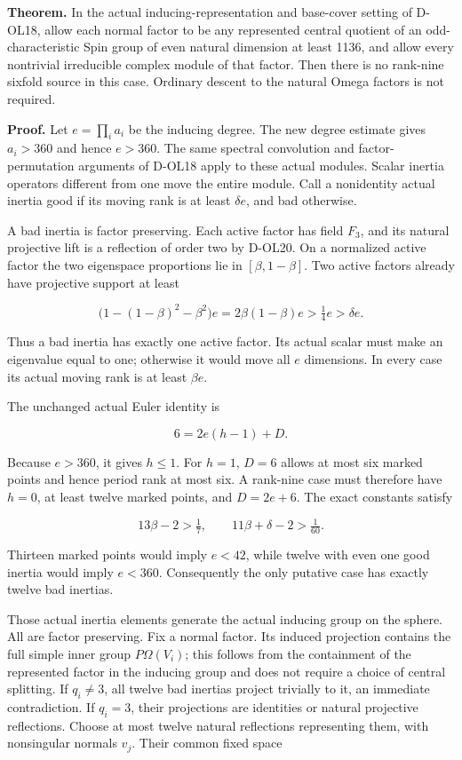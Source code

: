 \textbf{Theorem.} In the actual inducing-representation and base-cover setting of D-OL18, allow each normal factor to be any represented central quotient of an odd-characteristic Spin group of even natural dimension at least 1136, and allow every nontrivial irreducible complex module of that factor. Then there is no rank-nine sixfold source in this case. Ordinary descent to the natural Omega factors is not required.

\textbf{Proof.} Let \(e=\prod_i a_i\) be the inducing degree. The new degree estimate gives \(a_i>360\) and hence \(e>360\). The same spectral convolution and factor-permutation arguments of D-OL18 apply to these actual modules. Scalar inertia operators different from one move the entire module. Call a nonidentity actual inertia good if its moving rank is at least \(\delta e\), and bad otherwise.

A bad inertia is factor preserving. Each active factor has field \(F_3\), and its natural projective lift is a reflection of order two by D-OL20. On a normalized active factor the two eigenspace proportions lie in \([\beta,1-\beta]\). Two active factors already have projective support at least

\[
 \bigl(1-(1-\beta)^2-\beta^2\bigr)e
 =2\beta(1-\beta)e>\tfrac14e>\delta e.
 \tag{SP.15}
\]

Thus a bad inertia has exactly one active factor. Its actual scalar must make an eigenvalue equal to one; otherwise it would move all \(e\) dimensions. In every case its actual moving rank is at least \(\beta e\).

The unchanged actual Euler identity is

\[
 6=2e(h-1)+D.
 \tag{SP.16}
\]

Because \(e>360\), it gives \(h\le1\). For \(h=1\), \(D=6\) allows at most six marked points and hence period rank at most six. A rank-nine case must therefore have \(h=0\), at least twelve marked points, and \(D=2e+6\). The exact constants satisfy

\[
 13\beta-2>\tfrac17,\qquad
 11\beta+\delta-2>\tfrac1{60}.
 \tag{SP.17}
\]

Thirteen marked points would imply \(e<42\), while twelve with even one good inertia would imply \(e<360\). Consequently the only putative case has exactly twelve bad inertias.

Those actual inertia elements generate the actual inducing group on the sphere. All are factor preserving. Fix a normal factor. Its induced projection contains the full simple inner group \(P\Omega(V_i)\); this follows from the containment of the represented factor in the inducing group and does not require a choice of central splitting. If \(q_i\ne3\), all twelve bad inertias project trivially to it, an immediate contradiction. If \(q_i=3\), their projections are identities or natural projective reflections. Choose at most twelve natural reflections representing them, with nonsingular normals \(v_j\). Their common fixed space

